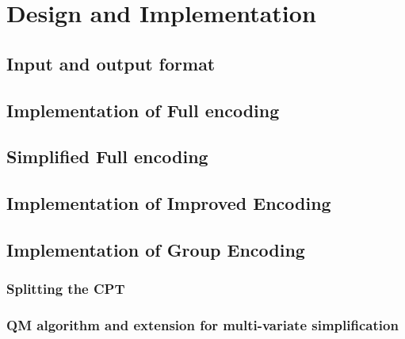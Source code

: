 \section{Design and Implementation}
    \subsection{Input and output format}
    \subsection{Implementation of Full encoding}
    \subsection{Simplified Full encoding}
    \subsection{Implementation of Improved Encoding}
    \subsection{Implementation of Group Encoding}
        \subsubsection{Splitting the CPT}
        \subsubsection{QM algorithm and extension for multi-variate simplification}
